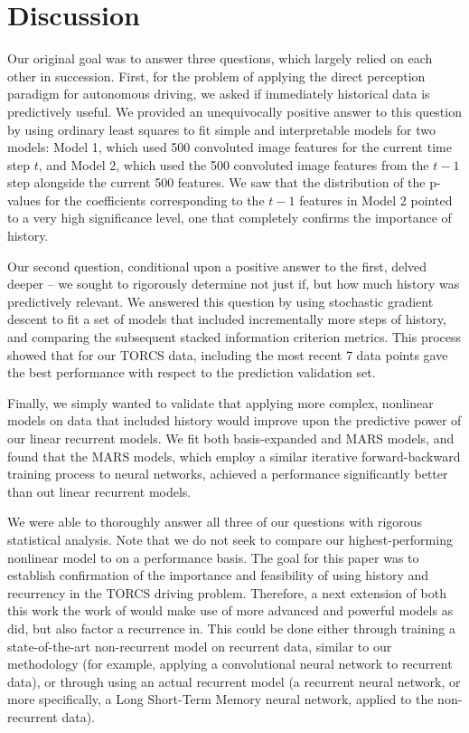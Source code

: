 \documentclass[11pt]{article}
\begin{document}
\section{Discussion}\label{sec:discussion}
Our original goal was to answer three questions, which largely relied on each other in succession.  First, for the problem of applying the direct perception paradigm for autonomous driving, we asked if immediately historical data is predictively useful.  We provided an unequivocally positive answer to this question by using ordinary least squares to fit simple and interpretable models for two models: Model 1, which used 500 convoluted image features for the current time step $t$, and Model 2, which used the 500 convoluted image features from the $t-1$ step alongside the current 500 features.  We saw that the distribution of the p-values for the coefficients corresponding to the $t-1$ features in Model 2 pointed to a very high significance level, one that completely confirms the importance of history.\par
Our second question, conditional upon a positive answer to the first, delved deeper -- we sought to rigorously determine not just if, but how much history was predictively relevant.  We answered this question by using stochastic gradient descent to fit a set of models that included incrementally more steps of history, and comparing the subsequent stacked information criterion metrics.  This process showed that for our TORCS data, including the most recent 7 data points gave the best performance with respect to the prediction validation set.\par
Finally, we simply wanted to validate that applying more complex, nonlinear models on data that included history would improve upon the predictive power of our linear recurrent models.  We fit both basis-expanded and MARS models, and found that the MARS models, which employ a similar iterative forward-backward training process to neural networks, achieved a performance significantly better than out linear recurrent models.\par
We were able to thoroughly answer all three of our questions with rigorous statistical analysis.  Note that we do not seek to compare our highest-performing nonlinear model to \cite{deepdriving} on a performance basis.  The goal for this paper was to establish confirmation of the importance and feasibility of using history and recurrency in the TORCS driving problem.  Therefore, a next extension of both this work the work of \cite{deepdriving} would make use of more advanced and powerful models as \cite{deepdriving} did, but also factor a recurrence in.  This could be done either through training a state-of-the-art non-recurrent model on recurrent data, similar to our methodology (for example, applying a convolutional neural network to recurrent data), or through using an actual recurrent model (a recurrent neural network, or more specifically, a Long Short-Term Memory neural network, applied to the non-recurrent data).
\newpage
\setlength{\bibsep}{1pt}
{


}
\end{document}
